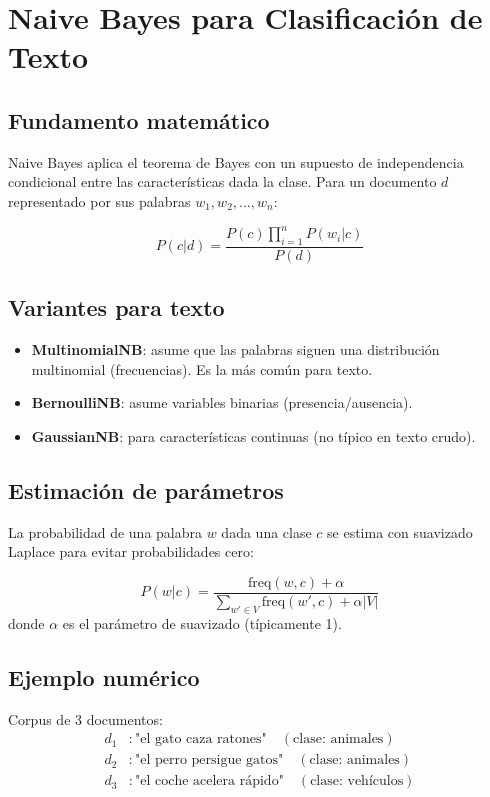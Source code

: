 \documentclass[12pt,a4paper,openany,oneside]{book}
\begin{document}
\section{Naive Bayes para Clasificación de Texto}

\subsection{Fundamento matemático}
Naive Bayes aplica el teorema de Bayes con un supuesto de independencia condicional entre las características dada la clase. Para un documento \(d\) representado por sus palabras \(w_1, w_2, ..., w_n\):

\[
P(c|d) = \frac{P(c) \prod_{i=1}^n P(w_i|c)}{P(d)}
\]

\subsection{Variantes para texto}
\begin{itemize}
    \item \textbf{MultinomialNB}: asume que las palabras siguen una distribución multinomial (frecuencias). Es la más común para texto.
    \item \textbf{BernoulliNB}: asume variables binarias (presencia/ausencia).
    \item \textbf{GaussianNB}: para características continuas (no típico en texto crudo).
\end{itemize}

\subsection{Estimación de parámetros}
La probabilidad de una palabra \(w\) dada una clase \(c\) se estima con suavizado Laplace para evitar probabilidades cero:

\[
P(w|c) = \frac{\text{freq}(w, c) + \alpha}{\sum_{w' \in V} \text{freq}(w', c) + \alpha |V|}
\]
donde \(\alpha\) es el parámetro de suavizado (típicamente 1).

\subsection{Ejemplo numérico}
Corpus de 3 documentos:
\begin{align*}
d_1 &: \text{"el gato caza ratones"} \quad (\text{clase: animales}) \\
d_2 &: \text{"el perro persigue gatos"} \quad (\text{clase: animales}) \\
d_3 &: \text{"el coche acelera rápido"} \quad (\text{clase: vehículos})
\end{align*}
\end{document}
